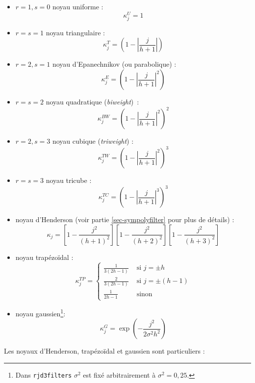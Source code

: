 \documentclass[
  12pt,
  a4paper,french]{article}
\newcommand\1{\mathds{1}}
\begin{document}
\begin{multicols}{2}

\begin{itemize}
\item
  \(r=1,s=0\) noyau uniforme :
  \[\kappa_j^U=1\]
\item
  \(r=s=1\) noyau triangulaire :
  \[\kappa_j^T=\left(
  1-
  \left\lvert
  \frac j {h+1}
  \right\lvert
  \right)\]
\item
  \(r=2,s=1\) noyau d'Epanechnikov (ou parabolique) :
  \[\kappa_j^E=\left(
  1-
  \left\lvert
  \frac j {h+1}
  \right\lvert^2
  \right)\]
\item
  \(r=s=2\) noyau quadratique (\emph{biweight})~:
  \[\kappa_j^{BW}=\left(
  1-
  \left\lvert
  \frac j {h+1}
  \right\lvert^2
  \right)^2\]
\item
  \(r = 2, s = 3\) noyau cubique (\emph{triweight}) :
  \[\kappa_j^{TW}=\left(
  1-
  \left\lvert
  \frac j {h+1}
  \right\lvert^2
  \right)^3\]
\item
  \(r = s = 3\) noyau tricube :
  \[\kappa_j^{TC}=\left(
  1-
  \left\lvert
  \frac j {h+1}
  \right\lvert^3
  \right)^3\]
\item
  noyau d'Henderson (voir partie \ref{sec-sympolyfilter} pour plus de détails) :
  \[
  \kappa_{j}=\left[1-\frac{j^2}{(h+1)^2}\right]
  \left[1-\frac{j^2}{(h+2)^2}\right]
  \left[1-\frac{j^2}{(h+3)^2}\right]
  \]
\item
  noyau trapézoïdal :
  \[
  \kappa_j^{TP}=
  \begin{cases}
  \frac{1}{3(2h-1)} & \text{ si }j=\pm h 
  \\
  \frac{2}{3(2h-1)} & \text{ si }j=\pm (h-1)\\
  \frac{1}{2h-1}& \text{ sinon}
  \end{cases}
  \]
\item
  noyau gaussien\footnote{
    Dans \texttt{rjd3filters} \(\sigma^2\) est fixé arbitrairement à \(\sigma^2=0,25\).}:
  \[
  \kappa_j^G=\exp\left(
  -\frac{
  j^2
  }{
  2\sigma^2h^2
  }\right)
  \]
\end{itemize}

\end{multicols}

Les noyaux d'Henderson, trapézoïdal et gaussien sont particuliers :
\end{document}
